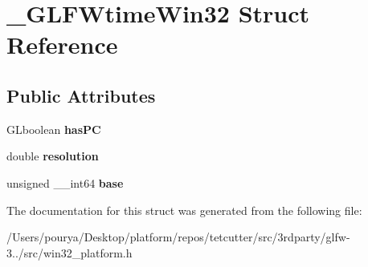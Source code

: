 \hypertarget{struct__GLFWtimeWin32}{}\section{\+\_\+\+G\+L\+F\+Wtime\+Win32 Struct Reference}
\label{struct__GLFWtimeWin32}
\subsection*{Public Attributes}
\begin{DoxyCompactItemize}
\item 
\hypertarget{struct__GLFWtimeWin32_a89cdea89c9d04404bd7ce728da9eb75f}{}G\+Lboolean {\bfseries has\+P\+C}\label{struct__GLFWtimeWin32_a89cdea89c9d04404bd7ce728da9eb75f}

\item 
\hypertarget{struct__GLFWtimeWin32_aec7ad5fec63ffaadd7002c40a8c10846}{}double {\bfseries resolution}\label{struct__GLFWtimeWin32_aec7ad5fec63ffaadd7002c40a8c10846}

\item 
\hypertarget{struct__GLFWtimeWin32_a8fa0f1a2bd7d5d56c5dde33643a7a8c9}{}unsigned \+\_\+\+\_\+int64 {\bfseries base}\label{struct__GLFWtimeWin32_a8fa0f1a2bd7d5d56c5dde33643a7a8c9}

\end{DoxyCompactItemize}


The documentation for this struct was generated from the following file\+:\begin{DoxyCompactItemize}
\item 
/\+Users/pourya/\+Desktop/platform/repos/tetcutter/src/3rdparty/glfw-\/3../src/win32\+\_\+platform.\+h\end{DoxyCompactItemize}
